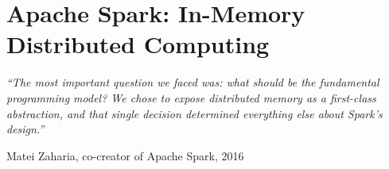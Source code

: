 
\chapter{Apache Spark: In-Memory Distributed Computing}
\label{ch:spark}

\epigraph{\textit{``The most important question we faced was: what should be
the fundamental programming model? We chose to expose distributed memory
as a first-class abstraction, and that single decision determined
everything else about Spark's design.''}}{Matei Zaharia, co-creator of Apache Spark, 2016}

\vspace{4pt}

